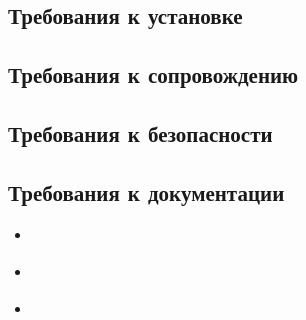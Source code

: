 \textheadingsep
\subsection{Требования к установке}

\headingtextsep

\underline{\hspace{\textwidth}}

\underline{\hspace{\textwidth}}

\textheadingsep
\subsection{Требования к сопровождению}

\headingtextsep

\underline{\hspace{\textwidth}}

\underline{\hspace{\textwidth}}

\textheadingsep
\subsection{Требования к безопасности}

\headingtextsep

\underline{\hspace{\textwidth}}

\underline{\hspace{\textwidth}}

\underline{\hspace{\textwidth}}

\textheadingsep
\subsection{Требования к документации}

\headingtextsep

\underline{\hspace{\textwidth}}

\begin{itemize}
    \item \underline{\hspace{10cm}}
    \item \underline{\hspace{10cm}}
    \item \underline{\hspace{10cm}}
\end{itemize}
